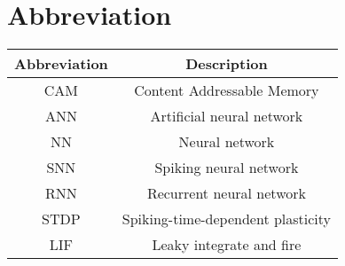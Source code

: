 \chapter*{\centering Abbreviation}%
\begin{center}
\end{center}
\begin{center}
    \begin{tabular}{ c c   }
        \hline
        Abbreviation & Description                       \\
        \hline
        CAM          & Content Addressable Memory        \\
        ANN          & Artificial neural network         \\
        NN           & Neural network                    \\
        SNN          & Spiking neural network            \\
        RNN          & Recurrent neural network          \\
        STDP         & Spiking-time-dependent plasticity \\
        LIF          & Leaky integrate and fire          \\

        \hline
    \end{tabular}
\end{center}